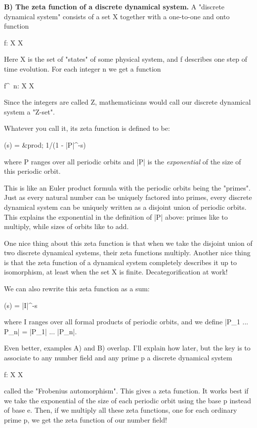 \textbf{B) The zeta function of a discrete dynamical system.}  A "discrete
dynamical system" consists of a set X together with a one-to-one 
and onto function

f: X \to  X

Here X is the set of "states" of some physical system, and f describes 
one step of time evolution.  For each integer n we get a function

f^{\ n}: X \to  X

Since the integers are called Z, mathematicians would call our
discrete dynamical system a "Z-set".

Whatever you call it, its zeta function is defined to be:

\zeta (s) = &prod;  1/(1 - |P|^{-s})

where P ranges over all periodic orbits and |P| is the 
\emph{exponential} of the size of this periodic orbit.  

This is like an Euler product formula with the periodic orbits 
being the "primes".  Just as every natural number can be uniquely 
factored into primes, every discrete dynamical system can be 
uniquely written as a disjoint union of periodic orbits.  
This explains the exponential in the definition of |P| above:
primes like to multiply, while sizes of orbits like to add.

One nice thing about this zeta function is that when we take
the disjoint union of two discrete dynamical systems, their zeta
functions multiply.  Another nice thing is that the zeta function
of a dynamical system completely describes it up to isomorphism, 
at least when the set X is finite.  Decategorification at work!
 
We can also rewrite this zeta function as a sum:

\zeta (s) = \sum  |I|^{-s}

where I ranges over all formal products of periodic orbits,
and we define |P_{1} ... P_{n}| = |P_{1}| ... |P_{n}|.  

Even better, examples A) and B) overlap.  I'll explain how later, but 
the key is to associate to any number field and any prime p a discrete 
dynamical system

f: X \to  X

called the "Frobenius automorphism".  This gives a zeta function.
It works best if we take the exponential of the size of each
periodic orbit using the base p instead of base e.   Then, if we 
multiply all these zeta functions, one for each ordinary prime p, 
we get the zeta function of our number field!  


